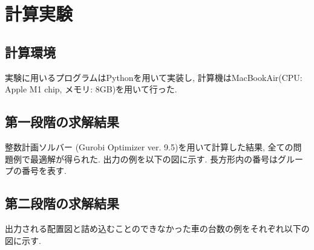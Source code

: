 \chapter{計算実験}\label{computational_result}
\section{計算環境}
実験に用いるプログラムはPythonを用いて実装し, 計算機はMacBookAir(CPU: Apple M1 chip, メモリ: 8GB)を用いて行った. 

\section{第一段階の求解結果}
整数計画ソルバー (Gurobi Optimizer ver. 9.5)を用いて計算した結果, 全ての問題例で最適解が得られた. 
出力の例を以下の図に示す. 
長方形内の番号はグループの番号を表す. 

\section{第二段階の求解結果}
出力される配置図と詰め込むことのできなかった車の台数の例をそれぞれ以下の図に示す. 

